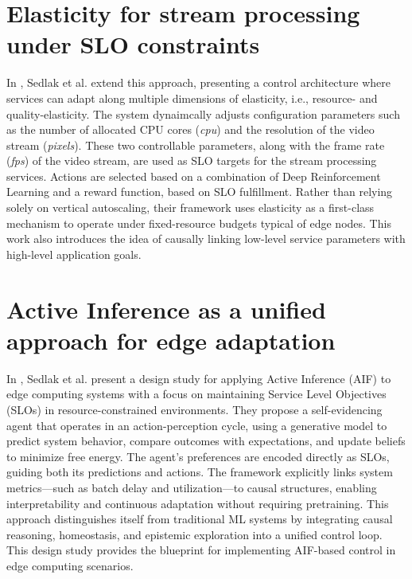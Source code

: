 \section{Elasticity for stream processing under SLO constraints}
In \cite{sedlak_towards_2025}, Sedlak et al. extend this approach, presenting a control architecture where services can adapt along multiple dimensions of elasticity, i.e., resource- and quality-elasticity. The system dynaimcally adjusts configuration parameters such as the number of allocated CPU cores (\textit{cpu}) and the resolution of the video stream (\textit{pixels}). These two controllable parameters, along with the frame rate (\textit{fps}) of the video stream, are used as SLO targets for the stream processing services. Actions are selected based on a combination of Deep Reinforcement Learning and a reward function, based on SLO fulfillment. Rather than relying solely on vertical autoscaling, their framework uses elasticity as a first-class mechanism to operate under fixed-resource budgets typical of edge nodes. This work also introduces the idea of causally linking low-level service parameters with high-level application goals.

\section{Active Inference as a unified approach for edge adaptation}
In \cite{sedlak_active_2024}, Sedlak et al. present a design study for applying Active Inference (AIF) to edge computing systems with a focus on maintaining Service Level Objectives (SLOs) in resource-constrained environments. They propose a self-evidencing agent that operates in an action-perception cycle, using a generative model to predict system behavior, compare outcomes with expectations, and update beliefs to minimize free energy. The agent’s preferences are encoded directly as SLOs, guiding both its predictions and actions. The framework explicitly links system metrics—such as batch delay and utilization—to causal structures, enabling interpretability and continuous adaptation without requiring pretraining. This approach distinguishes itself from traditional ML systems by integrating causal reasoning, homeostasis, and epistemic exploration into a unified control loop. This design study provides the blueprint for implementing AIF-based control in edge computing scenarios.

